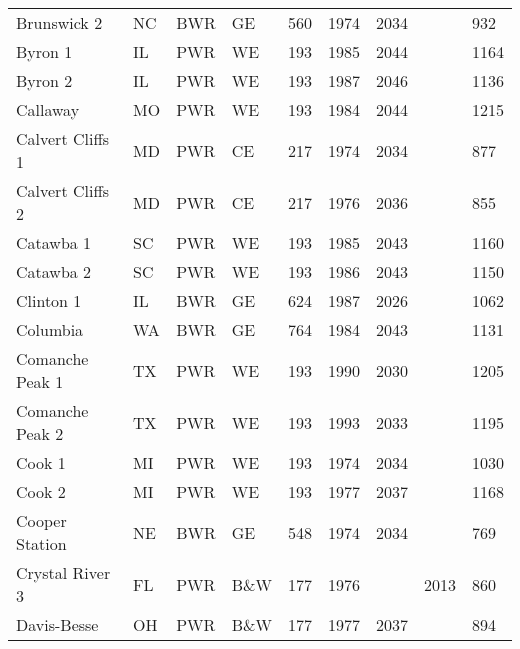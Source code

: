 \begin{table}[H]
\begin{tabular}{l l l l l l l l l}
    Brunswick 2           &NC & BWR & GE   & 560 & 1974 & 2034 &      & 932 \\
    Byron 1               &IL & PWR & WE   & 193 & 1985 & 2044 &      & 1164\\
    Byron 2               &IL & PWR & WE   & 193 & 1987 & 2046 &      & 1136\\
    Callaway              &MO & PWR & WE   & 193 & 1984 & 2044 &      & 1215\\
    Calvert Cliffs 1      &MD & PWR & CE   & 217 & 1974 & 2034 &      & 877 \\
    Calvert Cliffs 2      &MD & PWR & CE   & 217 & 1976 & 2036 &      & 855 \\
    Catawba 1             &SC & PWR & WE   & 193 & 1985 & 2043 &      & 1160\\
    Catawba 2             &SC & PWR & WE   & 193 & 1986 & 2043 &      & 1150\\
    Clinton 1             &IL & BWR & GE   & 624 & 1987 & 2026 &      & 1062\\
    Columbia              &WA & BWR & GE   & 764 & 1984 & 2043 &      & 1131\\
    Comanche Peak 1       &TX & PWR & WE   & 193 & 1990 & 2030 &      & 1205\\
    Comanche Peak 2       &TX & PWR & WE   & 193 & 1993 & 2033 &      & 1195\\
    Cook 1                &MI & PWR & WE   & 193 & 1974 & 2034 &      & 1030\\
    Cook 2                &MI & PWR & WE   & 193 & 1977 & 2037 &      & 1168\\
    Cooper Station        &NE & BWR & GE   & 548 & 1974 & 2034 &      & 769 \\
    Crystal River 3       &FL & PWR & B\&W & 177 & 1976 &      & 2013 & 860 \\
    Davis-Besse           &OH & PWR & B\&W & 177 & 1977 & 2037 &      & 894 \\
    \hline
    \end{tabular}
\end{table}

